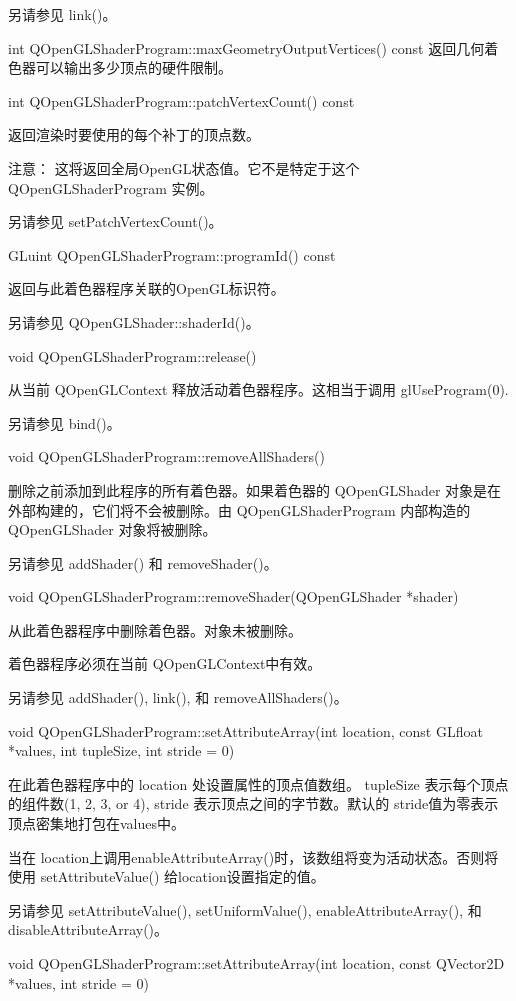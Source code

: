 另请参见 link()。

int QOpenGLShaderProgram::maxGeometryOutputVertices() const
返回几何着色器可以输出多少顶点的硬件限制。

int QOpenGLShaderProgram::patchVertexCount() const

返回渲染时要使用的每个补丁的顶点数。

注意： 这将返回全局OpenGL状态值。它不是特定于这个 QOpenGLShaderProgram 实例。

另请参见 setPatchVertexCount()。

GLuint QOpenGLShaderProgram::programId() const

返回与此着色器程序关联的OpenGL标识符。

另请参见 QOpenGLShader::shaderId()。

void QOpenGLShaderProgram::release()

从当前 QOpenGLContext 释放活动着色器程序。这相当于调用 glUseProgram(0).

另请参见 bind()。

void QOpenGLShaderProgram::removeAllShaders()

删除之前添加到此程序的所有着色器。如果着色器的 QOpenGLShader 对象是在外部构建的，它们将不会被删除。由 QOpenGLShaderProgram 内部构造的 QOpenGLShader 对象将被删除。

另请参见 addShader() 和 removeShader()。

void QOpenGLShaderProgram::removeShader(QOpenGLShader *shader)

从此着色器程序中删除着色器。对象未被删除。

着色器程序必须在当前 QOpenGLContext中有效。

另请参见 addShader(), link(), 和 removeAllShaders()。

void QOpenGLShaderProgram::setAttributeArray(int location, const GLfloat *values, int tupleSize, int stride = 0)

在此着色器程序中的 location 处设置属性的顶点值数组。 tupleSize 表示每个顶点的组件数(1, 2, 3, or 4), stride 表示顶点之间的字节数。默认的 stride值为零表示顶点密集地打包在values中。

当在 location上调用enableAttributeArray()时，该数组将变为活动状态。否则将使用 setAttributeValue() 给location设置指定的值。

另请参见 setAttributeValue(), setUniformValue(), enableAttributeArray(), 和 disableAttributeArray()。

void QOpenGLShaderProgram::setAttributeArray(int location, const QVector2D *values, int stride = 0)


